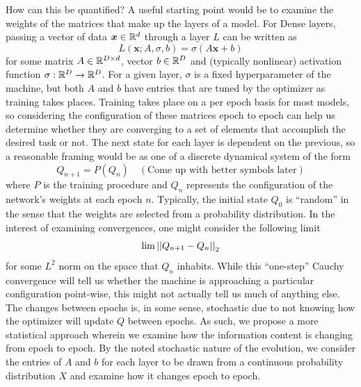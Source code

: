 How can this be quantified? A useful starting point would be to examine the weights of
the matrices that make up the layers of a model. For Dense layers, passing a vector of 
data $\boldsymbol{x} \in \mathbb{R}^{d}$ through a layer $L$ can be written as 
$$L(\boldsymbol{x}; A, \sigma, b) = \sigma(A\boldsymbol{x} + b)$$
for some matrix $A \in \mathbb{R}^{D\times d}$, vector $b \in \mathbb{R}^{D}$ and (typically nonlinear)
activation function $\sigma: \mathbb{R}^D \to \mathbb{R}^D$. For a given layer, $\sigma$ is a fixed 
hyperparameter of the machine, but both $A$ and $b$ have entries that are tuned by the 
optimizer as training takes places. Training takes place on a per epoch basis for most 
models, so considering the configuration of these matrices epoch to epoch can help us 
determine whether they are converging to a set of elements that accomplish the desired 
task or not. The next state for each layer is dependent on the previous, so a reasonable 
framing would be as one of a discrete dynamical system of the form
$$Q_{n+1} = P(Q_n) \quad (\text{Come up with better symbols later})$$
where $P$ is the training procedure and $Q_n$ represents the configuration of the network's
weights at each epoch $n$. Typically, the initial state $Q_0$ is ``random'' in the sense 
that the weights are selected from a probability distribution. In the interest of examining 
convergences, one might consider the following limit 
$$\lim \left|\left|Q_{n+1} - Q_n\right|\right|_2$$
for some $L^2$ norm on the space that $Q_n$ inhabits. While this ``one-step'' Cauchy 
convergence will tell us whether the machine is approaching a particular configuration
point-wise, this might not actually tell us much of anything else. The changes between 
epochs is, in some sense, stochastic due to not knowing how the optimizer will update $Q$
between epochs. As such, we propose a more statistical approach wherein we examine how the
information content is changing from epoch to epoch. By the noted stochastic nature of the 
evolution, we consider the entries of $A$ and $b$ for each layer to be drawn from a continuous 
probability distribution $X$ and examine how it changes epoch to epoch. 


